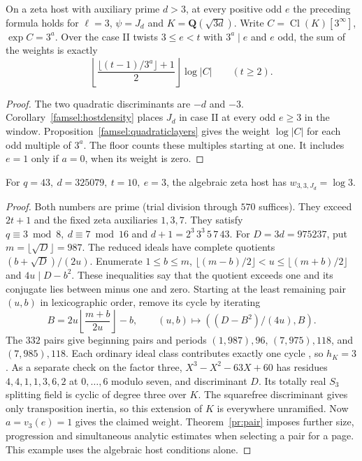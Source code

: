 \begin{corollary}\label{famsel:zetajd}
On a zeta host with auxiliary prime \(d>3\), at every positive odd \(e\)
the preceding formula holds for \(\ell=3\), \(\psi=J_d\) and
\(K=\mathbf Q(\sqrt{3d})\). Write \(C=\operatorname{Cl}(K)[3^\infty]\),
\(\exp C=3^a\). Over the case II twists \(3\le e<t\) with \(3^a\mid e\)
and \(e\) odd, the sum of the weights is exactly
\[
 \left\lfloor\frac{\lfloor(t-1)/3^a\rfloor+1}{2}\right\rfloor\log |C|
 \qquad(t\ge2).
\]
\end{corollary}
\begin{proof}
The two quadratic discriminants are \(-d\) and \(-3\).
Corollary~\ref{famsel:hostdensity} places \(J_d\) in case II at every
odd \(e\ge3\) in the window. Proposition~\ref{famsel:quadraticlayers}
gives the weight \(\log|C|\) for each odd multiple of \(3^a\).
The floor counts these multiples starting at one. It includes \(e=1\)
only if \(a=0\), when its weight is zero.
\end{proof}

\begin{lemma}\label{famsel:zetaclasssample}
For \(q=43,\ d=325079,\ t=10,\ e=3\), the algebraic zeta host has
\(w_{3,3,J_d}=\log3\).
\end{lemma}
\begin{proof}
Both numbers are prime (trial division through \(570\) suffices).
They exceed \(2t+1\) and the fixed zeta auxiliaries \(1,3,7\).
They satisfy \(q\equiv3\bmod8,\ d\equiv7\bmod16\) and
\(d+1=2^3\,3^3\,5\,7\,43\).
For \(D=3d=975237\), put \(m=\lfloor\sqrt D\rfloor=987\).
The reduced ideals have complete quotients \((b+\sqrt D)/(2u)\).
Enumerate \(1\le b\le m\),
\(\lfloor(m-b)/2\rfloor<u\le\lfloor(m+b)/2\rfloor\) and
\(4u\mid D-b^2\). These inequalities say that the quotient exceeds one
and its conjugate lies between minus one and zero. Starting at the
least remaining pair \((u,b)\) in lexicographic order, remove its cycle
by iterating
\[
 B=2u\left\lfloor\frac{m+b}{2u}\right\rfloor-b,\qquad
 (u,b)\longmapsto ((D-B^2)/(4u),B).
\]
The \(332\) pairs give beginning pairs and periods
\((1,987),96\), \((7,975),118\), and \((7,985),118\).
Each ordinary ideal class contributes exactly one cycle
\cite[pp.~826--827]{louboutinMollinWilliams}, so \(h_K=3\).
As a separate check on the factor three, \(X^3-X^2-63X+60\) has
residues \(4,4,1,1,3,6,2\) at \(0,\ldots,6\) modulo seven, and
discriminant \(D\). Its totally real \(S_3\) splitting field is cyclic
of degree three over \(K\). The squarefree discriminant gives only
transposition inertia, so this extension of \(K\) is everywhere
unramified. Now \(a=v_3(e)=1\) gives the claimed weight. Theorem~\ref{pr:pair}
imposes further size, progression and simultaneous analytic estimates
when selecting a pair for a page. This example uses the algebraic host
conditions alone.
\end{proof}

